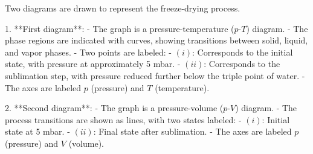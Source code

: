 Two diagrams are drawn to represent the freeze-drying process.  

1. **First diagram**:  
   - The graph is a pressure-temperature (\( p \)-\( T \)) diagram.  
   - The phase regions are indicated with curves, showing transitions between solid, liquid, and vapor phases.  
   - Two points are labeled:  
     - \( (i) \): Corresponds to the initial state, with pressure at approximately 5 mbar.  
     - \( (ii) \): Corresponds to the sublimation step, with pressure reduced further below the triple point of water.  
   - The axes are labeled \( p \) (pressure) and \( T \) (temperature).  

2. **Second diagram**:  
   - The graph is a pressure-volume (\( p \)-\( V \)) diagram.  
   - The process transitions are shown as lines, with two states labeled:  
     - \( (i) \): Initial state at 5 mbar.  
     - \( (ii) \): Final state after sublimation.  
   - The axes are labeled \( p \) (pressure) and \( V \) (volume).